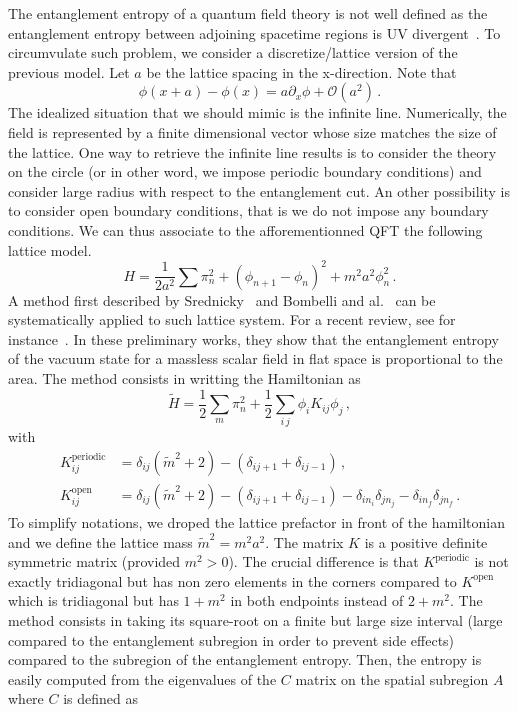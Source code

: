 \documentclass[a4paper]{article}
\begin{document}
The entanglement entropy of a quantum field theory is not well defined as the entanglement entropy between adjoining spacetime regions is UV divergent~\cite{Witten_2018}. To circumvulate such problem, we consider a discretize/lattice version of the previous model. Let $a$ be the lattice spacing in the x-direction. Note that
\begin{equation}
  \phi(x+a) - \phi(x) = a \partial_x \phi + \mathcal{O}(a^2)\,.
\end{equation}
The idealized situation that we should mimic is the infinite line. Numerically, the field is represented by a finite dimensional vector whose size matches the size of the lattice. One way to retrieve the infinite line results is to consider the theory on the circle (or in other word, we impose periodic boundary conditions) and consider large radius with respect to the entanglement cut. An other possibility is to consider open boundary conditions, that is we do not impose any boundary conditions. We can thus associate to the afforementionned QFT the following lattice model.
\begin{equation}
  H = \frac{1}{2a^2} \sum \pi_n^2 + \left(\phi_{n+1}-\phi_n\right)^2 + m^2 a^2 \phi_n^2\,.
\end{equation}
A method first described by Srednicky~\cite{Srednicki_1993} and Bombelli and al.~\cite{Bombelli:1986rw} can be systematically applied to such lattice system. For a recent review, see for instance~\cite{Casini_2009}\cite{bellucci2026entanglemententropymassivescalar}\cite{Boutivas_2023}\cite{Boutivas_2024}. In these preliminary works, they show that the entanglement entropy of the vacuum state for a massless scalar field in flat space is proportional to the area. The method consists in writting the Hamiltonian as
\begin{equation}
  \tilde{H} = \frac{1}{2}\sum_m \pi_n^2 + \frac{1}{2}\sum_{i\,j}\phi_i K_{ij}\phi_j\,,
\end{equation}
with
\begin{equation}
\begin{aligned}
  K^{\text{periodic}}_{ij}&= \delta_{ij}\left(\tilde{m}^2 + 2\right)-\left(\delta_{i j+1}+ \delta_{i j-1}\right)\,,\\
  K^{\text{open}}_{ij}&= \delta_{ij}\left(\tilde{m}^2 + 2\right)-\left(\delta_{i j+1}+ \delta_{i j-1}\right)- \delta_{i n_i} \delta_{j n_j} - \delta_{i n_f} \delta_{j n_f}\,.
\end{aligned}
\end{equation}
To simplify notations, we droped the lattice prefactor in front of the hamiltonian and we define the lattice mass $\tilde{m}^2=m^2 a^2$. The matrix $K$ is a positive definite symmetric matrix (provided $m^2>0$). The crucial difference is that $K^{\text{periodic}}$ is not exactly tridiagonal but has non zero elements in the corners compared to $K^{\text{open}}$ which is tridiagonal but has $1+ m^2$ in both endpoints instead of $2+m^2$. The method consists in taking its square-root on a finite but large size interval (large compared to the entanglement subregion in order to prevent side effects) compared to the subregion of the entanglement entropy. Then, the entropy is easily computed from the eigenvalues of the $C$ matrix on the spatial subregion $A$ where $C$ is defined as
\end{document}
